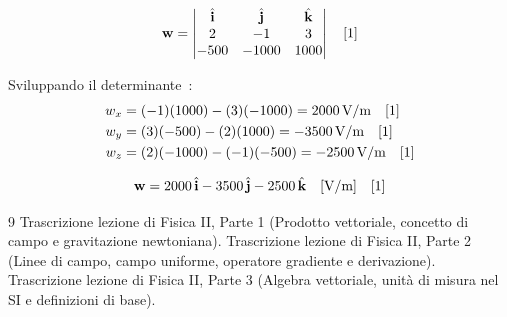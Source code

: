 \documentclass[12pt, a4paper]{article}
\begin{document}
\[
\mathbf{w} = 
\begin{vmatrix} 
\hat{\mathbf{i}} & \hat{\mathbf{j}} & \hat{\mathbf{k}} \\ 
2 & -1 & 3 \\ 
-500 & -1000 & 1000 
\end{vmatrix} \quad \text{\cite{1}}
\]

Sviluppando il determinante~\cite{1}:
\begin{align*}
w_x &= (-1)(1000) - (3)(-1000) = 2000 \, \text{V/m} \quad \text{\cite{1}} \\
w_y &= (3)(-500) - (2)(1000) = -3500 \, \text{V/m} \quad \text{\cite{1}} \\
w_z &= (2)(-1000) - (-1)(-500) = -2500 \, \text{V/m} \quad \text{\cite{1}}
\end{align*}

\[
\mathbf{w} = 2000 \, \hat{\mathbf{i}} - 3500 \, \hat{\mathbf{j}} - 2500 \, \hat{\mathbf{k}} \quad [\text{V/m}] \quad \text{\cite{1}}
\]

\begin{thebibliography}{9}
 Trascrizione lezione di Fisica II, Parte 1 (Prodotto vettoriale, concetto di campo e gravitazione newtoniana).
 Trascrizione lezione di Fisica II, Parte 2 (Linee di campo, campo uniforme, operatore gradiente e derivazione).
 Trascrizione lezione di Fisica II, Parte 3 (Algebra vettoriale, unità di misura nel SI e definizioni di base).
\end{thebibliography}
\end{document}
